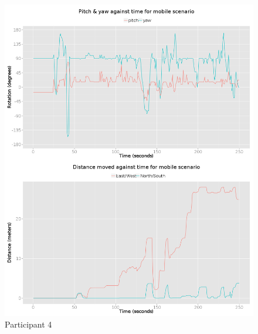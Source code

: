 \documentclass[oneside]{book}
\begin{document}
\begin{figure}[h]
	\begin{center}
		\includegraphics[width=\linewidth]{images/25072014_1500_4up.png}
		\caption{Participant 4}
		\label{participant_4_4up}
	\end{center}
\end{figure}
\end{document}
